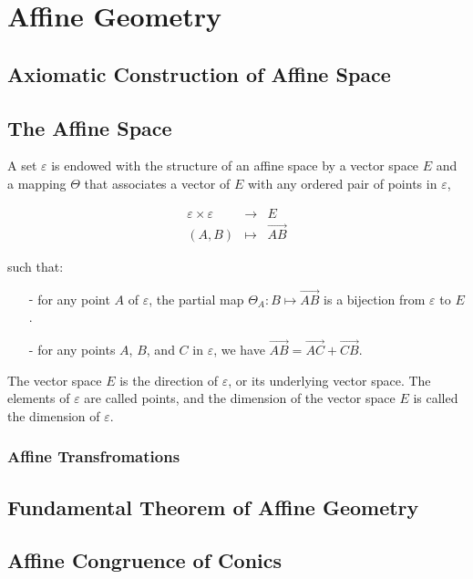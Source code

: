 \chapter{Affine Geometry}
\label{chap:affgeo}

\section{Axiomatic Construction of Affine Space}

\section{The Affine Space}

\begin{definition}
  A set $\varepsilon$ is endowed with the structure of an affine space by a vector space $E$ and
  a mapping $\Theta$ that associates a vector of $E$ with any ordered pair of points in
  $\varepsilon$,

  \begin{eqnarray*}
    \varepsilon \times \varepsilon &\longrightarrow & E \\
    (A,B) &\longmapsto & \overrightarrow{AB}
  \end{eqnarray*}

  such that:

  \begin{itemize}
    \item[-]{for any point $A$ of $\varepsilon$, the partial map $\Theta_A : B \mapsto
        \overrightarrow{AB}$ is a bijection from $\varepsilon$ to $E$.}
    \item[-]{for any points $A$, $B$, and $C$ in $\varepsilon$, we have $\overrightarrow{AB}=
        \overrightarrow{AC}+\overrightarrow{CB}$.}
  \end{itemize}

  The vector space $E$ is the direction of $\varepsilon$, or its underlying vector space. The
  elements of $\varepsilon$ are called points, and the dimension of the vector space $E$ is
  called the dimension of $\varepsilon$. \cite{audin}
\end{definition}

\subsection{Affine Transfromations}

\section{Fundamental Theorem of Affine Geometry}

\section{Affine Congruence of Conics}
